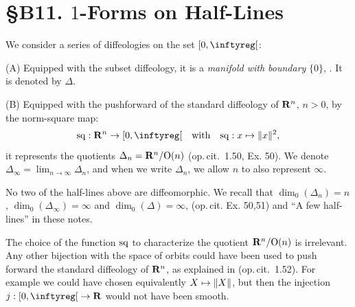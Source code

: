
\chapter*{\S B11. $1$-Forms on Half-Lines}
\setcounter{footnote}{0}


\begin{abstract}
  In this note we characterize the differential $1$-forms
  defined on the various half-lines $\Delta$,
  $\Delta_n$, $\Delta_\infty$,
  that share the same underlying set $\LeftClosedInterval{0,\infty}$.
\end{abstract}

We consider a series of diffeologies on the set $\LeftClosedInterval{0,\infty}$:

(A) Equipped with the subset diffeology,
it is a {\em manifold with boundary} $\{0\}$, \cite[\textsection\,4.12, 4.16]{PIZ13}.
It is denoted by $\Delta$.

(B) Equipped with the pushforward of the standard diffeology of $\mathbf{R}^n$,
$n>0$,
by the norm-square map:
$$
  \Sq: \RR^n \to \LeftClosedInterval{0,\infty} \quad \mbox{with} \quad \Sq : x \mapsto \Norm{x}^2,
  $$
it represents the quotients $\Delta_n = \mathbf{R}^n/\mathrm{O}(n)$ (op.\,cit. \textsection\,1.50, Ex. 50).
We denote $\Delta_\infty=\lim_{n\to \infty}\Delta_n$,
and when we write $\Delta_n$, we allow $n$ to also represent $\infty$.

No two of the half-lines above are diffeomorphic.
We recall that $\dim_0(\Delta_n)=n$, $\dim_0(\Delta_\infty)=\infty$ and $\dim_0(\Delta)=\infty$,
(op.\,cit. Ex. 50,51) and ``A few half-lines'' in these notes.

The choice of the function ${\operatorname{sq}}$ to characterize the quotient $\mathbf{R}^n/\mathrm{O}(n)$ is irrelevant.
Any other bijection with the space of orbits could have been used to push forward the standard diffeology of $\mathbf{R}^n$,
as explained in (op.\,cit. \textsection\,1.52).
For example we could have chosen equivalently $X \mapsto \Vert X \Vert$,
but then the injection $j:\LeftClosedInterval{0,\infty} \to \RR$ would not have been smooth.


